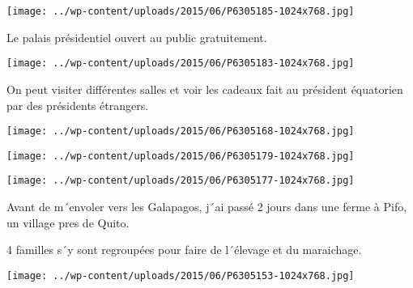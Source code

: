  

\begin{center} \texttt{[image: ../wp-content/uploads/2015/06/P6305185-1024x768.jpg]} \end{center}

 

 Le palais présidentiel ouvert au public gratuitement. 

 

\begin{center} \texttt{[image: ../wp-content/uploads/2015/06/P6305183-1024x768.jpg]} \end{center}

 

 On peut visiter différentes salles et voir les cadeaux fait au président équatorien par des présidents étrangers. 

 

\begin{center} \texttt{[image: ../wp-content/uploads/2015/06/P6305168-1024x768.jpg]} \end{center}

 

 

\begin{center} \texttt{[image: ../wp-content/uploads/2015/06/P6305179-1024x768.jpg]} \end{center}

 

 

\begin{center} \texttt{[image: ../wp-content/uploads/2015/06/P6305177-1024x768.jpg]} \end{center}

 

 Avant de m´envoler vers les Galapagos, j´ai passé 2 jours dans une ferme à Pifo, un village pres de Quito. 

 4 familles s´y sont regroupées pour faire de l´élevage et du maraichage. 

 

\begin{center} \texttt{[image: ../wp-content/uploads/2015/06/P6305153-1024x768.jpg]} \end{center}




 
 
